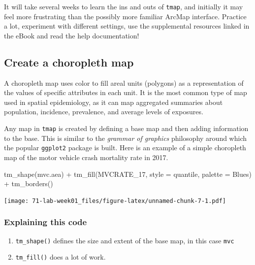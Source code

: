 \documentclass[
]{book}
\newenvironment{Shaded}{\begin{snugshade}}{\end{snugshade}}
\newcommand{\AttributeTok}[1]{\textcolor[rgb]{0.77,0.63,0.00}{#1}}
\newcommand{\FunctionTok}[1]{\textcolor[rgb]{0.00,0.00,0.00}{#1}}
\newcommand{\NormalTok}[1]{#1}
\newcommand{\SpecialCharTok}[1]{\textcolor[rgb]{0.00,0.00,0.00}{#1}}
\newcommand{\StringTok}[1]{\textcolor[rgb]{0.31,0.60,0.02}{#1}}
\providecommand{\tightlist}{%
  \setlength{\itemsep}{0pt}\setlength{\parskip}{0pt}}
\begin{document}
It will take several weeks to learn the ins and outs of \texttt{tmap}, and initially it may feel more frustrating than the possibly more familiar ArcMap interface. Practice a lot, experiment with different settings, use the supplemental resources linked in the eBook and read the help documentation!

\hypertarget{create-a-choropleth-map}{%
\subsection{Create a choropleth map}\label{create-a-choropleth-map}}

A choropleth map uses color to fill areal units (polygons) as a representation of the values of specific attributes in each unit. It is the most common type of map used in spatial epidemiology, as it can map aggregated summaries about population, incidence, prevalence, and average levels of exposures.

Any map in \texttt{tmap} is created by defining a base map and then adding information to the base. This is similar to the \emph{grammar of graphics} philosophy around which the popular \texttt{ggplot2} package is built. Here is an example of a simple choropleth map of the motor vehicle crash mortality rate in 2017.

\begin{Shaded}
\begin{Highlighting}[]
\FunctionTok{tm\_shape}\NormalTok{(mvc.aea) }\SpecialCharTok{+}
  \FunctionTok{tm\_fill}\NormalTok{(}\StringTok{\textquotesingle{}MVCRATE\_17\textquotesingle{}}\NormalTok{,}
          \AttributeTok{style =} \StringTok{\textquotesingle{}quantile\textquotesingle{}}\NormalTok{,}
          \AttributeTok{palette =} \StringTok{\textquotesingle{}Blues\textquotesingle{}}\NormalTok{) }\SpecialCharTok{+}
  \FunctionTok{tm\_borders}\NormalTok{() }
\end{Highlighting}
\end{Shaded}

\texttt{[image: 71-lab-week01\_files/figure-latex/unnamed-chunk-7-1.pdf]}

\hypertarget{explaining-this-code}{%
\subsubsection{Explaining this code}\label{explaining-this-code}}

\begin{enumerate}
\def\labelenumi{\arabic{enumi}.}
\tightlist
\item
  \texttt{tm\_shape()} defines the size and extent of the base map, in this case \texttt{mvc}
\item
  \texttt{tm\_fill()} does a lot of work.
\end{enumerate}
\end{document}
